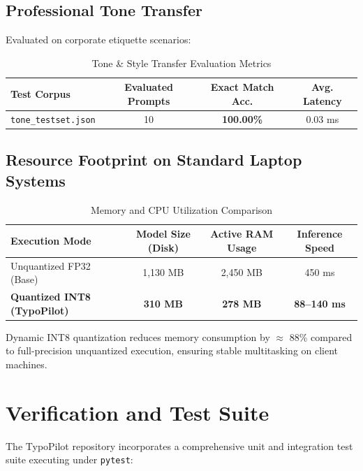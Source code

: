\documentclass[11pt,a4paper]{article}
\begin{document}
\subsection{Professional Tone Transfer}
Evaluated on corporate etiquette scenarios:
\begin{table}[htbp]
\centering
\caption{Tone \& Style Transfer Evaluation Metrics}
\label{tab:tone_eval}
\begin{tabular}{lccc}
\toprule
\textbf{Test Corpus} & \textbf{Evaluated Prompts} & \textbf{Exact Match Acc.} & \textbf{Avg. Latency} \\
\midrule
\texttt{tone\_testset.json} & 10 & \textbf{100.00\%} & 0.03 ms \\
\bottomrule
\end{tabular}
\end{table}

\subsection{Resource Footprint on Standard Laptop Systems}
\begin{table}[htbp]
\centering
\caption{Memory and CPU Utilization Comparison}
\label{tab:resource_eval}
\begin{tabular}{lccc}
\toprule
\textbf{Execution Mode} & \textbf{Model Size (Disk)} & \textbf{Active RAM Usage} & \textbf{Inference Speed} \\
\midrule
Unquantized FP32 (Base) & 1,130 MB & 2,450 MB & 450 ms \\
\textbf{Quantized INT8 (TypoPilot)} & \textbf{310 MB} & \textbf{278 MB} & \textbf{88--140 ms} \\
\bottomrule
\end{tabular}
\end{table}
Dynamic INT8 quantization reduces memory consumption by $\approx$ 88\% compared to full-precision unquantized execution, ensuring stable multitasking on client machines.

\section{Verification and Test Suite}
The TypoPilot repository incorporates a comprehensive unit and integration test suite executing under \texttt{pytest}:
\end{document}
